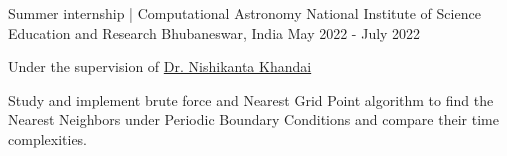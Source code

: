 \begin{cventries}
 	\cventry
{Summer internship | Computational Astronomy} %
{National Institute of Science Education and Research} %
{Bhubaneswar, India} %
{May 2022 - July 2022} %
{
  \begin{cvitems} %
     	\item{Under the supervision of \href{https://niser.irins.org/profile/241972}{Dr. Nishikanta Khandai}}
    \item Study and implement brute force and Nearest Grid Point algorithm to find the Nearest Neighbors under Periodic Boundary Conditions and compare their time complexities. \\
  \end{cvitems}
}

\end{cventries}
